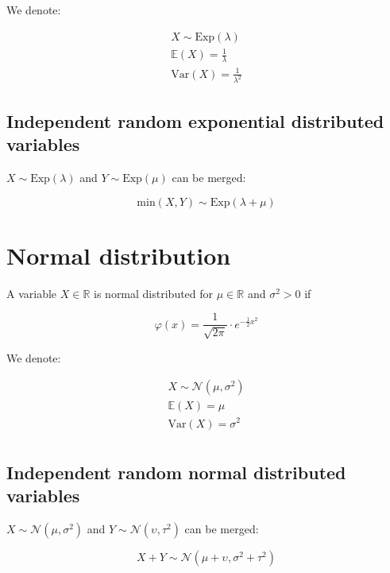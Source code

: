 \documentclass[twoside, a4paper, twocolumn]{article}
\begin{document}
    We denote:

    \begin{eqnarray}
        X \sim \textrm{Exp}(\lambda) \\
        \mathbb{E}(X) = \frac{1}{\lambda} \\
        \textrm{Var}(X) = \frac{1}{\lambda^2}
    \end{eqnarray}

    \subsection{Independent random exponential distributed variables}

    $X \sim \textrm{Exp}(\lambda)$ and $Y \sim \textrm{Exp}(\mu)$ can be merged:

    \begin{equation}
        \textrm{min}(X,Y) \sim \textrm{Exp}(\lambda + \mu)
    \end{equation}

    \section{Normal distribution}

    A variable $X \in \mathbb{R}$ is normal distributed for $\mu \in
    \mathbb{R}$ and $\sigma^2 > 0$ if

    \begin{equation}
    \varphi(x) = \frac{1}{\sqrt{2\pi}} \cdot  e^{-\frac{1}{2}x^2}
    \end{equation}

    We denote:

    \begin{eqnarray}
        X \sim \mathcal{N}(\mu, \sigma^2) \\
        \mathbb{E}(X) = \mu \\
        \textrm{Var}(X) = \sigma^2 \\
    \end{eqnarray}

    \subsection{Independent random normal distributed variables}

    $X \sim \mathcal{N}(\mu, \sigma^2)$ and $Y \sim \mathcal{N}(\upsilon, \tau^2)$ can be merged:

    \begin{equation}
        X + Y \sim \mathcal{N}(\mu + \upsilon, \sigma^2 + \tau^2)
    \end{equation}
\end{document}
